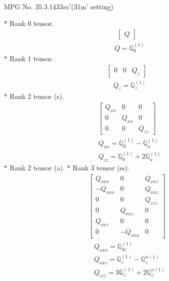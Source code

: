 \documentclass[fleqn,8pt,landscape]{jsarticle}
\begin{document}
\setcounter{MaxMatrixCols}{32}

\renewcommand{\tablename}{Table~}
\renewcommand{\figurename}{Figure~}
\begin{center}
\LARGE
MPG No. 35.3.143\quad$3m'$\quad(31m' setting)
\end{center}
* Rank 0 tensor.
\begin{align*}
\begin{bmatrix} Q \end{bmatrix}
\end{align*}
\begin{align*}
& Q = \mathbb{Q}_{0}^{(1)}
\end{align*}
* Rank 1 tensor.
\begin{align*}
\begin{bmatrix} 0 & 0 & Q_{z} \end{bmatrix}
\end{align*}
\begin{align*}
& Q_{z} = \mathbb{Q}_{z}^{(1)}
\end{align*}
* Rank 2 tensor (s).
\begin{align*}
\begin{bmatrix} Q_{xx} & 0 & 0 \\ 0 & Q_{xx} & 0 \\ 0 & 0 & Q_{zz} \end{bmatrix}
\end{align*}
\begin{align*}
& Q_{xx} = \mathbb{Q}_{0}^{(1)} - \mathbb{Q}_{u}^{(1)} \\
& Q_{zz} = \mathbb{Q}_{0}^{(1)} + 2 \mathbb{Q}_{u}^{(1)}
\end{align*}
* Rank 2 tensor (a).
* Rank 3 tensor (ss).
\begin{align*}
\begin{bmatrix} Q_{xxx} & 0 & Q_{xxz} \\ - Q_{xxx} & 0 & Q_{xxz} \\ 0 & 0 & Q_{zzz} \\ 0 & Q_{xxz} & 0 \\ Q_{xxz} & 0 & 0 \\ 0 & - Q_{xxx} & 0 \end{bmatrix}
\end{align*}
\begin{align*}
& Q_{xxx} = \mathbb{Q}_{3c}^{(1)} \\
& Q_{xxz} = \mathbb{Q}_{z}^{(1)} - \mathbb{Q}_{z}^{\alpha(1)} \\
& Q_{zzz} = 3 \mathbb{Q}_{z}^{(1)} + 2 \mathbb{Q}_{z}^{\alpha(1)}
\end{align*}
\end{document}
